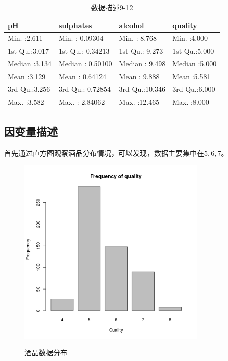 \documentclass[fontset=ubuntu]{ctexart}
\begin{document}
        \begin{table}[ht]
            \centering
            \caption{数据描述9-12}
            \vspace{5pt}
            \begin{tabular}{llll}
                \hline
                pH &   sulphates &    alcohol &    quality \\ 
                \hline
                Min.   :2.611   & Min.   :-0.09304   & Min.   : 8.768   & Min.   :4.000   \\ 
                1st Qu.:3.017   & 1st Qu.: 0.34213   & 1st Qu.: 9.273   & 1st Qu.:5.000   \\ 
                Median :3.134   & Median : 0.50100   & Median : 9.498   & Median :5.000   \\ 
                Mean   :3.129   & Mean   : 0.64124   & Mean   : 9.888   & Mean   :5.581   \\ 
                3rd Qu.:3.256   & 3rd Qu.: 0.72854   & 3rd Qu.:10.346   & 3rd Qu.:6.000   \\ 
                Max.   :3.582   & Max.   : 2.84062   & Max.   :12.465   & Max.   :8.000   \\ 
                \hline
            \end{tabular}
            \label{tab:description9-12}
        \end{table}
        
        \clearpage
        \subsection{因变量描述}
            首先通过直方图观察酒品分布情况，可以发现，数据主要集中在$5, 6, 7$。 
            \begin{figure}[htbp]
                \centering
                \includegraphics[width=0.8\textwidth]{../figures/quality-frequency.png}
                \label{fig:quality}
                \caption{酒品数据分布}
            \end{figure}
\end{document}
